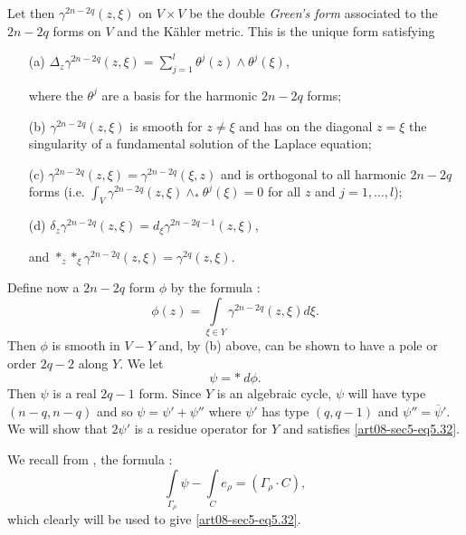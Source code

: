 Let then $\gamma^{2n-2q}(z,\xi)$ on $V\times V$ be the double {\em Green's form} associated to the $2n-2q$ forms on $V$ and the K\"ahler metric. This is the unique form satisfying
\begin{itemize}
\item[(a)]\pageoriginale \hfill $\Delta_{z}\gamma^{2n-2q}(z,\xi)=\sum\limits^{l}_{j=1}\theta^{j}(z)\wedge \theta^{j}(\xi)$,\hfill\,

where the $\theta^{j}$ are a basis for the harmonic $2n-2q$ forms;

\item[(b)] $\gamma^{2n-2q}(z,\xi)$ is smooth for $z\neq\xi$ and has on the diagonal $z=\xi$ the singularity of a fundamental solution of the Laplace equation;

\item[(c)] $\gamma^{2n-2q}(z,\xi)=\gamma^{2n-2q}(\xi,z)$ and is orthogonal to all harmonic $2n-2q$ forms (i.e. $\int_{V}\gamma^{2n-2q}(z,\xi)\wedge_{*}\theta^{j}(\xi)=0$ for all $z$ and $j=1,\ldots,l$); 

\item[(d)] $\delta_{z}\gamma^{2n-2q}(z,\xi)=d_{\xi}\gamma^{2n-2q-1}(z,\xi)$, 

and $*_{z}*_{\xi}\gamma^{2n-2q}(z,\xi)=\gamma^{2q}(z,\xi)$.
\end{itemize}

Define now a $2n-2q$ form $\phi$ by the formula :
\begin{equation}
\phi(z)=\int\limits_{\xi\in Y}\gamma^{2n-2q}(z,\xi)d\xi.\label{art08-sec5-eq5.33}
\end{equation}
Then $\phi$ is smooth in $V-Y$ and, by (b) above, can be shown to have a pole or order $2q-2$ along $Y$. We let
\begin{equation}
\psi=* \ d\phi.\label{art08-sec5-eq5.34}
\end{equation}
Then $\psi$ is a real $2q-1$ form. Since $Y$ is an algebraic cycle, $\psi$ will have type $(n-q,n-q)$ and so $\psi=\psi'+\psi''$ where $\psi'$ has type $(q,q-1)$ and $\psi''=\overline{\psi}'$. We will show that $2\psi'$ is a residue operator for $Y$ and satisfies \eqref{art08-sec5-eq5.32}.

We recall from \cite{art08-key17}, the formula :
\begin{equation}
\int\limits_{\Gamma_{\rho}}\psi-\int\limits_{C}e_{\rho}=(\Gamma_{\rho}\cdot C),\label{art08-sec5-eq5.35}
\end{equation}
which clearly will be used to give \eqref{art08-sec5-eq5.32}.

